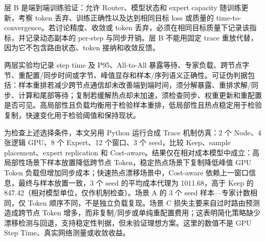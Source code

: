 层 B 是端到端训练验证：允许 Router、模型状态和 expert capacity 随训练更新，考察 token 丢弃、训练正确性以及达到相同目标 loss 或质量的 time-to-convergence。若讨论精度、收敛或 token 丢弃，必须在相同目标质量下记录该指标，并记录动态副本的 per-step 与同步开销。层 B 不能用固定 trace 重放代替，因为它不包含路由状态、token 接纳和收敛反馈。

两层实验均记录 step time 及 P95、All-to-All 暴露等待、专家负载、跨节点字节、重配置/同步时间或字节、峰值显存和样本/序列语义正确性。可证伪判据包括：样本重排若减少跨节点通信却未改善端到端时间，须分解暴露、重排求解/同步、计算和尾部等待；复制若缓解热点却未加速，须检查同步、权重更新和重配置是否可见。高局部性且负载均衡用于检验样本重排，低局部性且热点稳定用于检验复制，快速变化用于检验阈值和保持现状。

为检查上述选择条件，本文另用 Python 运行合成 Trace 机制仿真：2 个 Node、4 张逻辑 GPU、8 个 Expert、12 个窗口、3 个 seed，比较 Keep、sample placement、expert replication 和 Cost-aware。结果仅在相对成本模型中成立：高局部性场景下样本放置降低跨节点 Token，稳定热点场景下复制降低峰值 GPU Token 负载但增加同步成本；快速热点漂移场景中，Cost-aware 依赖上一窗口信息，最终与样本放置一致，3 个 seed 的平均成本代理为 1011.68，高于 Keep 的 847.42（相对模型单位，仅作机制检查）。场景 A 的 3 个 seed 样本—专家计数相同，仅 Token 顺序不同，不是独立负载复现。场景 C 损失主要来自过时路由预测造成跨节点 Token 增多，而非复制/同步或单纯重配置费用；这表明简化策略缺少漂移检测与回退，支持稳定性判据，但未验证理想方案。这里的数值不是 GPU Step Time、真实网络测量或收敛收益。

